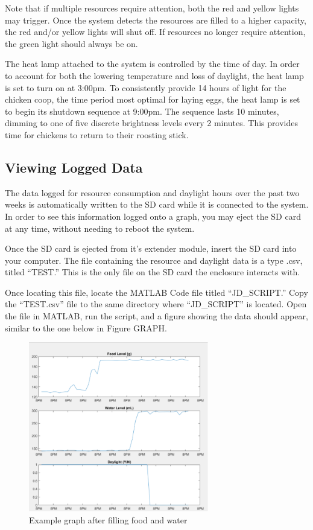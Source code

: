 \documentclass{article}
\begin{document}
Note that if multiple resources require attention, both the red and yellow lights may trigger. Once the system detects the resources are filled to a higher capacity, the red and/or yellow lights will shut off. If resources no longer require attention, the green light should always be on.

The heat lamp attached to the system is controlled by the time of day. In order to account for both the lowering temperature and loss of daylight, the heat lamp is set to turn on at 3:00pm. To consistently provide 14 hours of light for the chicken coop, the time period most optimal for laying eggs, the heat lamp is set to begin its shutdown sequence at 9:00pm. The sequence lasts 10 minutes, dimming to one of five discrete brightness levels every 2 minutes. This provides time for chickens to return to their roosting stick.

\subsection{Viewing Logged Data}
The data logged for resource consumption and daylight hours over the past two weeks is automatically written to the SD card while it is connected to the system. In order to see this information logged onto a graph, you may eject the SD card at any time, without needing to reboot the system.

Once the SD card is ejected from it’s extender module, insert the SD card into your computer. The file containing the resource and daylight data is a type .csv, titled “TEST.” This is the only file on the SD card the enclosure interacts with.

Once locating this file, locate the MATLAB Code file titled “JD\_SCRIPT.” Copy the “TEST.csv” file to the same directory where “JD\_SCRIPT” is located. Open the file in MATLAB, run the script, and a figure showing the data should appear, similar to the one below in Figure GRAPH.

\begin{figure}[H]
    \centering
    \includegraphics[width=0.7\textwidth]{fig/example-graph.png}
    \caption{Example graph after filling food and water}
    \label{fig:example-graph}
\end{figure}
\end{document}
